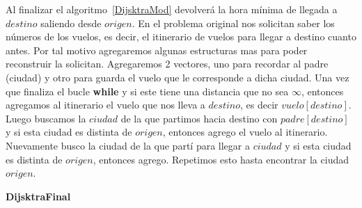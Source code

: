 \newpage
Al finalizar el algoritmo~\ref{DijsktraMod} devolverá la hora mínima de llegada a $destino$ saliendo desde $origen$. 
En el problema original nos solicitan saber los números de los vuelos, es decir, el itinerario de vuelos para llegar a destino cuanto antes.
Por tal motivo agregaremos algunas estructuras mas para poder reconstruir la solicitan. Agregaremos 2 vectores, uno para recordar al padre (ciudad) 
y otro para guarda el vuelo que le corresponde a dicha ciudad. Una vez que finaliza el bucle \textbf{while} y si este tiene una distancia que no sea
$\infty$, entonces agregamos al itinerario el vuelo que nos lleva a $destino$, es decir $vuelo[destino]$. 
Luego buscamos la $ciudad$ de la que partimos hacia destino con $padre[destino]$ y si esta ciudad es distinta de $origen$, entonces agrego el 
vuelo al itinerario. Nuevamente busco la ciudad de la que partí para llegar a $ciudad$ y si esta ciudad es distinta de $origen$, entonces agrego.
Repetimos esto hasta encontrar la ciudad $origen$.

\LinesNumbered
\begin{algorithm}[H]
\DontPrintSemicolon
{}
\caption{\textbf{DijsktraFinal} \label{DijsktraFinal}}
\end{algorithm}

